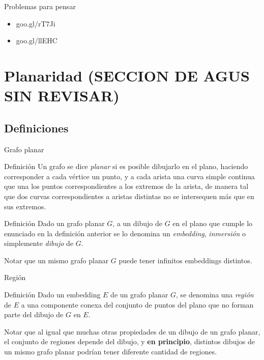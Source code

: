 \documentclass[compress]{beamer}
\begin{document}
\begin{frame}{Problemas para pensar}

\begin{itemize}
\item goo.gl/rT7Ji
\item goo.gl/llEHC
\end{itemize}

\end{frame}

\section{Planaridad (SECCION DE AGUS SIN REVISAR)}

\subsection{Definiciones}

\begin{frame}{Grafo planar}

\begin{block}{Definición}
    Un grafo se dice \textit{planar} si es posible dibujarlo en el plano, haciendo corresponder a cada vértice un punto, y a cada arista una curva simple continua que una los puntos correspondientes a los extremos de la arista, de manera tal que dos curvas correspondientes a aristas distintas no se intersequen más que en sus extremos.
\end{block}

\begin{block}{Definición}
    Dado un grafo planar $G$, a un dibujo de $G$ en el plano que cumple lo enunciado en la definición anterior se lo denomina un \textit{embedding}, \textit{inmersión} o simplemente \textit{dibujo} de $G$.
\end{block}

Notar que un mismo grafo planar $G$ puede tener infinitos embeddings distintos.

\end{frame}

\begin{frame}{Región}

\begin{block}{Definición}
    Dado un embedding $E$ de un grafo planar $G$, se denomina una \textit{región} de $E$ a una componente conexa del conjunto de puntos del plano que no forman parte del dibujo de $G$ en $E$.
\end{block}

Notar que al igual que muchas otras propiedades de un dibujo de un grafo planar, el conjunto de regiones depende del dibujo, y \textbf{en principio}, distintos dibujos de un mismo grafo planar podrían tener diferente cantidad de regiones.

\end{frame}
\end{document}
